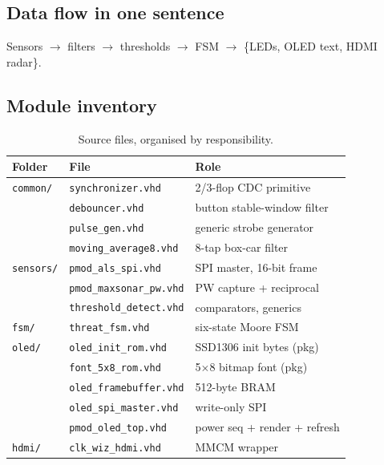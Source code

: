 \documentclass[11pt,a4paper]{article}
\begin{document}
\subsection{Data flow in one sentence}

Sensors $\longrightarrow$ filters $\longrightarrow$ thresholds
$\longrightarrow$ FSM $\longrightarrow$ \{LEDs, OLED text, HDMI radar\}.

\subsection{Module inventory}

\begin{table}[h]
  \centering
  \caption{Source files, organised by responsibility.}
  \begin{tabular}{@{}lll@{}}
    \toprule
    Folder            & File                        & Role \\
    \midrule
    \texttt{common/}  & \texttt{synchronizer.vhd}   & 2/3-flop CDC primitive \\
                      & \texttt{debouncer.vhd}      & button stable-window filter \\
                      & \texttt{pulse\_gen.vhd}     & generic strobe generator \\
                      & \texttt{moving\_average8.vhd} & 8-tap box-car filter \\
    \texttt{sensors/} & \texttt{pmod\_als\_spi.vhd} & SPI master, 16-bit frame \\
                      & \texttt{pmod\_maxsonar\_pw.vhd} & PW capture + reciprocal \\
                      & \texttt{threshold\_detect.vhd}  & comparators, generics \\
    \texttt{fsm/}     & \texttt{threat\_fsm.vhd}        & six-state Moore FSM \\
    \texttt{oled/}    & \texttt{oled\_init\_rom.vhd}    & SSD1306 init bytes (pkg) \\
                      & \texttt{font\_5x8\_rom.vhd}     & 5$\times$8 bitmap font (pkg) \\
                      & \texttt{oled\_framebuffer.vhd}  & 512-byte BRAM \\
                      & \texttt{oled\_spi\_master.vhd}  & write-only SPI \\
                      & \texttt{pmod\_oled\_top.vhd}    & power seq + render + refresh \\
    \texttt{hdmi/}    & \texttt{clk\_wiz\_hdmi.vhd}     & MMCM wrapper \\

\end{tabular}
\end{table}
\end{document}
